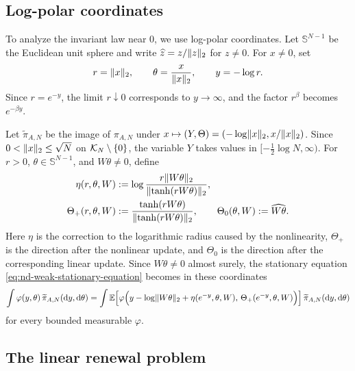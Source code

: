 \documentclass[11pt,reqno,a4paper]{article}
\newcommand{\Ee}{\E}
\begin{document}
\subsection{Log-polar coordinates}
\label{subsec:nd-log-polar-coordinates}

To analyze the invariant law near $0$, we use log-polar coordinates. Let
$\mathbb S^{N-1}$ be the Euclidean unit sphere and write
$\widehat z=z/\lVert z\rVert_2$ for $z\neq0$. For $x\neq0$, set
\begin{equation*}
  r=\lVert x\rVert_2,\qquad
  \theta=\frac{x}{\lVert x\rVert_2},\qquad
  y=-\log r .
\end{equation*}
Since $r=e^{-y}$, the limit $r\downarrow0$ corresponds to $y\to\infty$, and
the factor $r^\beta$ becomes $e^{-\beta y}$.

Let $\widetilde{\pi}_{A,N}$ be the image of $\pi_{A,N}$ under
$x\mapsto(Y,\Theta)=(-\log\lVert x\rVert_2,x/\lVert x\rVert_2)$. Since
$0<\lVert x\rVert_2\leq\sqrt N$ on $\mathcal K_N\setminus\{0\}$, the variable $Y$ takes
values in $[-\frac12\log N,\infty)$. For $r>0$, $\theta\in\mathbb S^{N-1}$,
and $W\theta\neq0$, define
\begin{align}
  \eta(r,\theta,W)
  &:=
  \log
  \frac{r\lVert W\theta\rVert_2}{\lVert\tanh(rW\theta)\rVert_2},
  \label{eq:nd-eta-definition}
  \\
  \Theta_+(r,\theta,W)
  &:=
  \frac{\tanh(rW\theta)}
  {\lVert\tanh(rW\theta)\rVert_2},
  \qquad
  \Theta_0(\theta,W):=\widehat{W\theta}.
  \label{eq:nd-angular-definitions}
\end{align}
Here $\eta$ is the correction to the logarithmic radius caused by the
nonlinearity, $\Theta_+$ is the direction after the nonlinear update, and
$\Theta_0$ is the direction after the corresponding linear update.
Since $W\theta\neq0$ almost surely, the stationary equation \cref{eq:nd-weak-stationary-equation} becomes in these coordinates
\begin{equation}\label{eq:nd-log-polar-stationary}
  \begin{split}
  \int \varphi(y,\theta)\,\widetilde{\pi}_{A,N}(\mathrm{d}y,\mathrm{d}\theta)
  =
  \int
  \Ee\Bigl[
  \varphi\Bigl(
    y-\log\norm{W\theta}_2+\eta(e^{-y},\theta,W),\,
    \Theta_+(e^{-y},\theta,W)
  \Bigr)
  \Bigr]\,
  \widetilde{\pi}_{A,N}(\mathrm{d}y,\mathrm{d}\theta)
  \end{split}
\end{equation}
for every bounded measurable $\varphi$.

\subsection{The linear renewal problem}
\label{subsec:nd-linear-renewal}
\end{document}

